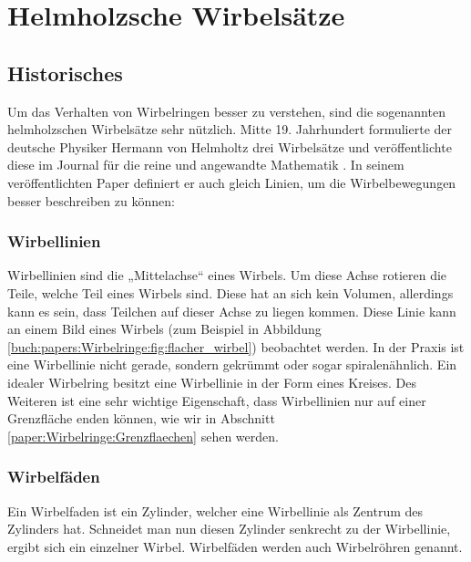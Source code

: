 %
%
%
\section{Helmholzsche Wirbelsätze}

\subsection{Historisches}

Um das Verhalten von Wirbelringen besser zu verstehen, sind die sogenannten helmholzschen Wirbelsätze sehr nützlich. 
Mitte 19. Jahrhundert formulierte der deutsche Physiker Hermann von Helmholtz drei Wirbelsätze und veröffentlichte diese im Journal für die reine und angewandte Mathematik \cite{Wirbelringe:JournalHelmholz}.
In seinem veröffentlichten Paper definiert er auch gleich Linien, um die Wirbelbewegungen besser beschreiben zu können:

\subsubsection*{Wirbellinien \label{paper:Wirbelringe:Wirbellinien}}

Wirbellinien sind die „Mittelachse“ eines Wirbels. 
Um diese Achse rotieren die Teile, welche Teil eines Wirbels sind. 
Diese hat an sich kein Volumen, allerdings kann es sein, dass Teilchen auf dieser Achse zu liegen kommen. 
Diese Linie kann an einem Bild eines Wirbels (zum Beispiel in Abbildung \ref{buch:papers:Wirbelringe:fig:flacher_wirbel}) beobachtet werden. 
In der Praxis ist eine Wirbellinie nicht gerade, sondern gekrümmt oder sogar spiralenähnlich. 
Ein idealer Wirbelring besitzt eine Wirbellinie in der Form eines Kreises.
Des Weiteren ist eine sehr wichtige Eigenschaft, dass Wirbellinien nur auf einer Grenzfläche enden können, 
wie wir in Abschnitt \ref{paper:Wirbelringe:Grenzflaechen} sehen werden.

\subsubsection*{Wirbelfäden \label{paper:Wirbelringe:Wirbelfaden}}

Ein Wirbelfaden ist ein Zylinder, welcher eine Wirbellinie als Zentrum des Zylinders hat. 
Schneidet man nun diesen Zylinder senkrecht zu der Wirbellinie, ergibt sich ein einzelner Wirbel. 
Wirbelfäden werden auch Wirbelröhren genannt.

